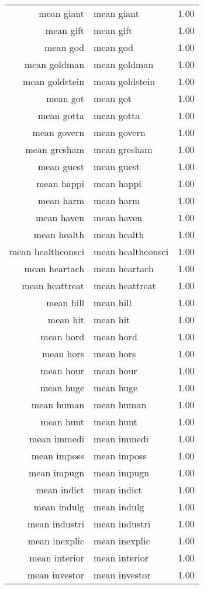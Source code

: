 \begin{table}[ht]
\begin{tabular}{rlr}
  mean giant & mean giant & 1.00 \\ 
  mean gift & mean gift & 1.00 \\ 
  mean god & mean god & 1.00 \\ 
  mean goldman & mean goldman & 1.00 \\ 
  mean goldstein & mean goldstein & 1.00 \\ 
  mean got & mean got & 1.00 \\ 
  mean gotta & mean gotta & 1.00 \\ 
  mean govern & mean govern & 1.00 \\ 
  mean gresham & mean gresham & 1.00 \\ 
  mean guest & mean guest & 1.00 \\ 
  mean happi & mean happi & 1.00 \\ 
  mean harm & mean harm & 1.00 \\ 
  mean haven & mean haven & 1.00 \\ 
  mean health & mean health & 1.00 \\ 
  mean healthconsci & mean healthconsci & 1.00 \\ 
  mean heartach & mean heartach & 1.00 \\ 
  mean heattreat & mean heattreat & 1.00 \\ 
  mean hill & mean hill & 1.00 \\ 
  mean hit & mean hit & 1.00 \\ 
  mean hord & mean hord & 1.00 \\ 
  mean hors & mean hors & 1.00 \\ 
  mean hour & mean hour & 1.00 \\ 
  mean huge & mean huge & 1.00 \\ 
  mean human & mean human & 1.00 \\ 
  mean hunt & mean hunt & 1.00 \\ 
  mean immedi & mean immedi & 1.00 \\ 
  mean imposs & mean imposs & 1.00 \\ 
  mean impugn & mean impugn & 1.00 \\ 
  mean indict & mean indict & 1.00 \\ 
  mean indulg & mean indulg & 1.00 \\ 
  mean industri & mean industri & 1.00 \\ 
  mean inexplic & mean inexplic & 1.00 \\ 
  mean interior & mean interior & 1.00 \\ 
  mean investor & mean investor & 1.00 \\ 

\end{tabular}
\end{table}
